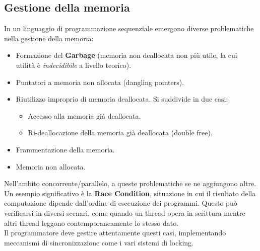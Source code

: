\documentclass{article}
\begin{document}
\pagebreak

\subsection*{Gestione della memoria}
In un linguaggio di programmazione sequenziale emergono diverse problematiche nella gestione della memoria:
\begin{itemize}
    \item Formazione del \textbf{Garbage} (memoria non deallocata non più utile, la cui utilità è \textit{indecidibile} a livello teorico).
    \item Puntatori a memoria non allocata (dangling pointers).
    \item Riutilizzo improprio di memoria deallocata. Si suddivide in due casi:
    \begin{itemize}
        \item Accesso alla memoria già deallocata.
        \item Ri-deallocazione della memoria già deallocata (double free).
    \end{itemize}
    \item Frammentazione della memoria.
    \item Memoria non allocata.
\end{itemize}

Nell'ambito concorrente/parallelo, a queste problematiche se ne aggiungono altre. Un esempio significativo è la \textbf{Race Condition}, situazione in cui il risultato della computazione dipende dall'ordine di esecuzione dei programmi. Questo può verificarsi in diversi scenari, come quando un thread opera in scrittura mentre altri thread leggono contemporaneamente lo stesso dato.\\
Il programmatore deve gestire attentamente questi casi, implementando meccanismi di sincronizzazione come i vari sistemi di locking.
\end{document}
